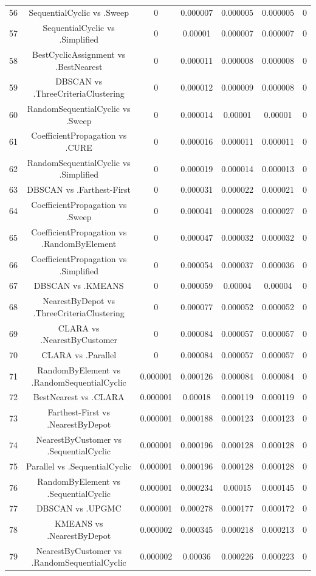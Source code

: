 \documentclass[a4paper,10pt]{article}
\begin{document}
\begin{landscape}
\begin{table}[!htp]
\begin{tabular}{ccccccc}
56&SequentialCyclic vs .Sweep&0&0.000007&0.000005&0.000005&0\\
57&SequentialCyclic vs .Simplified&0&0.00001&0.000007&0.000007&0\\
58&BestCyclicAssignment vs .BestNearest&0&0.000011&0.000008&0.000008&0\\
59&DBSCAN vs .ThreeCriteriaClustering&0&0.000012&0.000009&0.000008&0\\
60&RandomSequentialCyclic vs .Sweep&0&0.000014&0.00001&0.00001&0\\
61&CoefficientPropagation vs .CURE&0&0.000016&0.000011&0.000011&0\\
62&RandomSequentialCyclic vs .Simplified&0&0.000019&0.000014&0.000013&0\\
63&DBSCAN vs .Farthest-First&0&0.000031&0.000022&0.000021&0\\
64&CoefficientPropagation vs .Sweep&0&0.000041&0.000028&0.000027&0\\
65&CoefficientPropagation vs .RandomByElement&0&0.000047&0.000032&0.000032&0\\
66&CoefficientPropagation vs .Simplified&0&0.000054&0.000037&0.000036&0\\
67&DBSCAN vs .KMEANS&0&0.000059&0.00004&0.00004&0\\
68&NearestByDepot vs .ThreeCriteriaClustering&0&0.000077&0.000052&0.000052&0\\
69&CLARA vs .NearestByCustomer&0&0.000084&0.000057&0.000057&0\\
70&CLARA vs .Parallel&0&0.000084&0.000057&0.000057&0\\
71&RandomByElement vs .RandomSequentialCyclic&0.000001&0.000126&0.000084&0.000084&0\\
72&BestNearest vs .CLARA&0.000001&0.00018&0.000119&0.000119&0\\
73&Farthest-First vs .NearestByDepot&0.000001&0.000188&0.000123&0.000123&0\\
74&NearestByCustomer vs .SequentialCyclic&0.000001&0.000196&0.000128&0.000128&0\\
75&Parallel vs .SequentialCyclic&0.000001&0.000196&0.000128&0.000128&0\\
76&RandomByElement vs .SequentialCyclic&0.000001&0.000234&0.00015&0.000145&0\\
77&DBSCAN vs .UPGMC&0.000001&0.000278&0.000177&0.000172&0\\
78&KMEANS vs .NearestByDepot&0.000002&0.000345&0.000218&0.000213&0\\
79&NearestByCustomer vs .RandomSequentialCyclic&0.000002&0.00036&0.000226&0.000223&0\\

\end{tabular}
\end{table}
\end{landscape}
\end{document}
